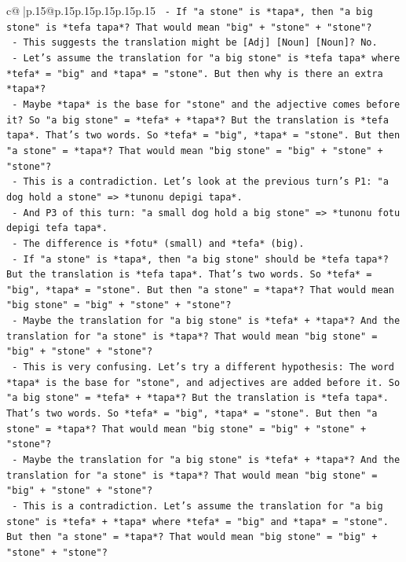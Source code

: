 \documentclass{article}
\begin{document}
{\begin{supertabular}{c@{$\;$}|p{.15\linewidth}@{}p{.15\linewidth}p{.15\linewidth}p{.15\linewidth}p{.15\linewidth}p{.15\linewidth}}
{{{\texttt{                {-} If "a stone" is *tapa*, then "a big stone" is *tefa tapa*? That would mean "big" + "stone" + "stone"?} \\
\texttt{                {-} This suggests the translation might be {[}Adj{]} {[}Noun{]} {[}Noun{]}? No.} \\
\texttt{                {-} Let's assume the translation for "a big stone" is *tefa tapa* where *tefa* = "big" and *tapa* = "stone". But then why is there an extra *tapa*?} \\
\texttt{                {-} Maybe *tapa* is the base for "stone" and the adjective comes before it? So "a big stone" = *tefa* + *tapa*? But the translation is *tefa tapa*. That's two words. So *tefa* = "big", *tapa* = "stone". But then "a stone" = *tapa*? That would mean "big stone" = "big" + "stone" + "stone"?} \\
\texttt{                {-} This is a contradiction. Let's look at the previous turn's P1: "a dog hold a stone" => *tunonu depigi tapa*.} \\
\texttt{                {-} And P3 of this turn: "a small dog hold a big stone" => *tunonu fotu depigi tefa tapa*.} \\
\texttt{                {-} The difference is *fotu* (small) and *tefa* (big).} \\
\texttt{                {-} If "a stone" is *tapa*, then "a big stone" should be *tefa tapa*? But the translation is *tefa tapa*. That's two words. So *tefa* = "big", *tapa* = "stone". But then "a stone" = *tapa*? That would mean "big stone" = "big" + "stone" + "stone"?} \\
\texttt{                {-} Maybe the translation for "a big stone" is *tefa* + *tapa*? And the translation for "a stone" is *tapa*? That would mean "big stone" = "big" + "stone" + "stone"?} \\
\texttt{                {-} This is very confusing. Let's try a different hypothesis: The word *tapa* is the base for "stone", and adjectives are added before it. So "a big stone" = *tefa* + *tapa*? But the translation is *tefa tapa*. That's two words. So *tefa* = "big", *tapa* = "stone". But then "a stone" = *tapa*? That would mean "big stone" = "big" + "stone" + "stone"?} \\
\texttt{                {-} Maybe the translation for "a big stone" is *tefa* + *tapa*? And the translation for "a stone" is *tapa*? That would mean "big stone" = "big" + "stone" + "stone"?} \\
\texttt{                {-} This is a contradiction. Let's assume the translation for "a big stone" is *tefa* + *tapa* where *tefa* = "big" and *tapa* = "stone". But then "a stone" = *tapa*? That would mean "big stone" = "big" + "stone" + "stone"?} \\
}}}
\end{supertabular}}
\end{document}
